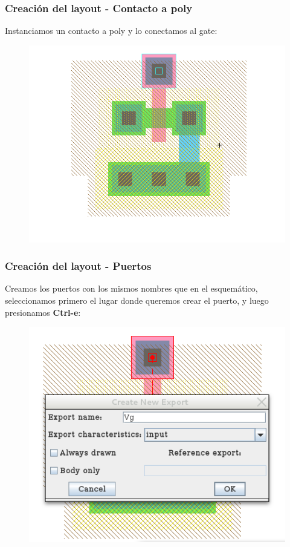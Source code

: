 \documentclass{beamer}
\begin{document}
\begin{frame}
\frametitle{Creación del layout - Contacto a poly}
Instanciamos un contacto a poly y lo conectamos al gate: 
\begin{figure}
  \includegraphics[width=0.89\linewidth]{figuras/edicionElectric-10.png}
\end{figure}
\end{frame}
\begin{frame}
\frametitle{Creación del layout - Puertos}
Creamos los puertos con los mismos nombres que en el esquemático, seleccionamos primero el lugar donde queremos crear el puerto, y luego presionamos \textbf{Ctrl-e}:
\begin{figure}
  \includegraphics[width=0.59\linewidth]{figuras/edicionElectric-11.png}
\end{figure}
\end{frame}
\end{document}
